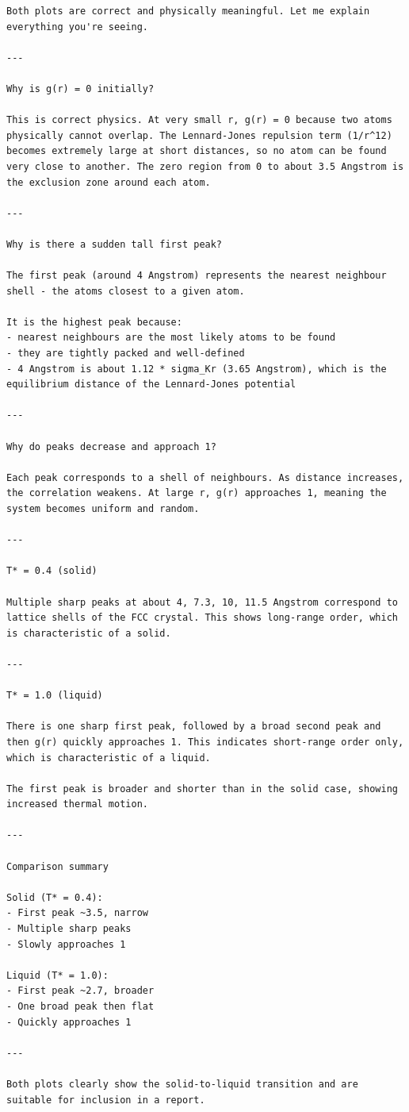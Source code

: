 \begin{lstlisting}
Both plots are correct and physically meaningful. Let me explain everything you're seeing.

---

Why is g(r) = 0 initially?

This is correct physics. At very small r, g(r) = 0 because two atoms physically cannot overlap. The Lennard-Jones repulsion term (1/r^12) becomes extremely large at short distances, so no atom can be found very close to another. The zero region from 0 to about 3.5 Angstrom is the exclusion zone around each atom.

---

Why is there a sudden tall first peak?

The first peak (around 4 Angstrom) represents the nearest neighbour shell - the atoms closest to a given atom.

It is the highest peak because:
- nearest neighbours are the most likely atoms to be found
- they are tightly packed and well-defined
- 4 Angstrom is about 1.12 * sigma_Kr (3.65 Angstrom), which is the equilibrium distance of the Lennard-Jones potential

---

Why do peaks decrease and approach 1?

Each peak corresponds to a shell of neighbours. As distance increases, the correlation weakens. At large r, g(r) approaches 1, meaning the system becomes uniform and random.

---

T* = 0.4 (solid)

Multiple sharp peaks at about 4, 7.3, 10, 11.5 Angstrom correspond to lattice shells of the FCC crystal. This shows long-range order, which is characteristic of a solid.

---

T* = 1.0 (liquid)

There is one sharp first peak, followed by a broad second peak and then g(r) quickly approaches 1. This indicates short-range order only, which is characteristic of a liquid.

The first peak is broader and shorter than in the solid case, showing increased thermal motion.

---

Comparison summary

Solid (T* = 0.4):
- First peak ~3.5, narrow
- Multiple sharp peaks
- Slowly approaches 1

Liquid (T* = 1.0):
- First peak ~2.7, broader
- One broad peak then flat
- Quickly approaches 1

---

Both plots clearly show the solid-to-liquid transition and are suitable for inclusion in a report.
\end{lstlisting}

